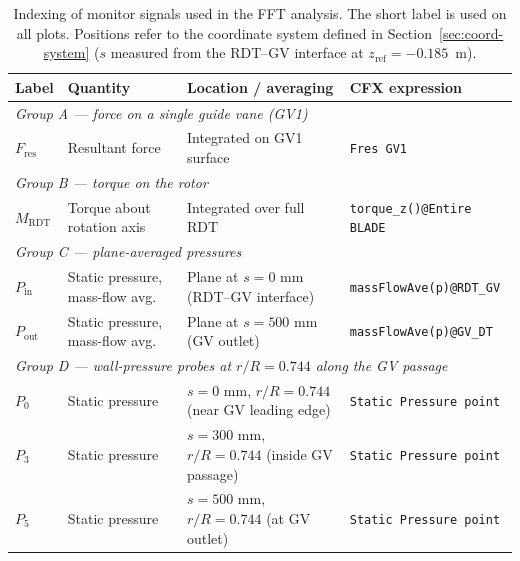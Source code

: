 \begin{table}[H]
\centering
\small
\caption{Indexing of monitor signals used in the FFT analysis. The short label is used on all plots. Positions refer to the coordinate system defined in Section~\ref{sec:coord-system} ($s$ measured from the RDT--GV interface at $z_{\mathrm{ref}} = -0.185$~m).}
\label{tab:monitor-index}
\begin{tabular}{p{} p{} p{} p{}}
\hline
Label & Quantity & Location / averaging & CFX expression \\ \hline
\multicolumn{4}{l}{\textit{Group A --- force on a single guide vane (GV1)}} \\
$F_{\mathrm{res}}$ & Resultant force & Integrated on GV1 surface & \texttt{Fres GV1} \\[0.4em]

\multicolumn{4}{l}{\textit{Group B --- torque on the rotor}} \\
$M_{\mathrm{RDT}}$ & Torque about rotation axis & Integrated over full RDT & \texttt{torque\_z()@Entire BLADE} \\[0.4em]

\multicolumn{4}{l}{\textit{Group C --- plane-averaged pressures}} \\
$P_{\mathrm{in}}$ & Static pressure, mass-flow avg. & Plane at $s = 0$ mm (RDT--GV interface) & \texttt{massFlowAve(p)@RDT\_GV} \\
$P_{\mathrm{out}}$ & Static pressure, mass-flow avg. & Plane at $s = 500$ mm (GV outlet) & \texttt{massFlowAve(p)@GV\_DT} \\[0.4em]

\multicolumn{4}{l}{\textit{Group D --- wall-pressure probes at $r/R = 0.744$ along the GV passage}} \\
$P_0$ & Static pressure & $s = 0$ mm, $r/R = 0.744$ (near GV leading edge) & \texttt{Static Pressure point} \\
$P_3$ & Static pressure & $s = 300$ mm, $r/R = 0.744$ (inside GV passage) & \texttt{Static Pressure point} \\
$P_5$ & Static pressure & $s = 500$ mm, $r/R = 0.744$ (at GV outlet) & \texttt{Static Pressure point} \\ \hline
\end{tabular}
\end{table}
 
